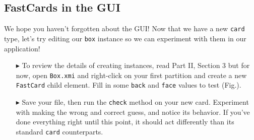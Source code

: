 \newpage
\hypertarget{subsec:fastGUI}{}
\subsection{FastCards in the GUI}
\genHeader

We hope you haven't forgotten about the GUI! Now that we have a new \texttt{card} type, let's try editing our \texttt{box} instance so we can experiment with
them in our application!

\begin{itemize}
  
\item[$\blacktriangleright$] To review the details of creating instances, read Part II, Section 3 but for now, open \texttt{Box.xmi} and right-click on your
first partition and create a new \texttt{FastCard} child element. Fill in some \texttt{back} and \texttt{face} values to test (Fig.).

\item[$\blacktriangleright$] Save your file, then run the \texttt{check} method on your new card. Experiment with making the wrong and correct guess, and notice
its behavior. If you've done everything right until this point, it should act differently than its standard \texttt{card} counterparts.

\end{itemize}
